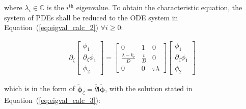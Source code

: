 
where $\lambda_i \in \mathbb{C}$ is the $i^{\text{th}}$ eigenvalue. To obtain the characteristic equation, the system of PDEs shall be reduced to the ODE system in Equation~(\ref{eq:eigval_calc_2}) $\forall i \geq 0$:

\begin{equation} \label{eq:eigval_calc_2}
    \begin{aligned}
        \partial_\zeta \begin{bmatrix}
            \phi_1 \\ \partial_\zeta \phi_1 \\ \phi_2
        \end{bmatrix} = \begin{bmatrix}
            0 & 1 & 0 \\
            \frac{\lambda-k_r}{D} & \frac{v}{D} & 0 \\
            0 & 0 & \tau \lambda 
        \end{bmatrix} \begin{bmatrix}
            \phi_1 \\ \partial_\zeta \phi_1 \\ \phi_2
        \end{bmatrix}
    \end{aligned}
\end{equation}

which is in the form of $ \tilde{\bm{\phi}}_\zeta  = \tilde{\mathfrak{A}} \tilde{\bm{\phi}}$, with the solution stated in Equation~(\ref{eq:eigval_calc_3}):

